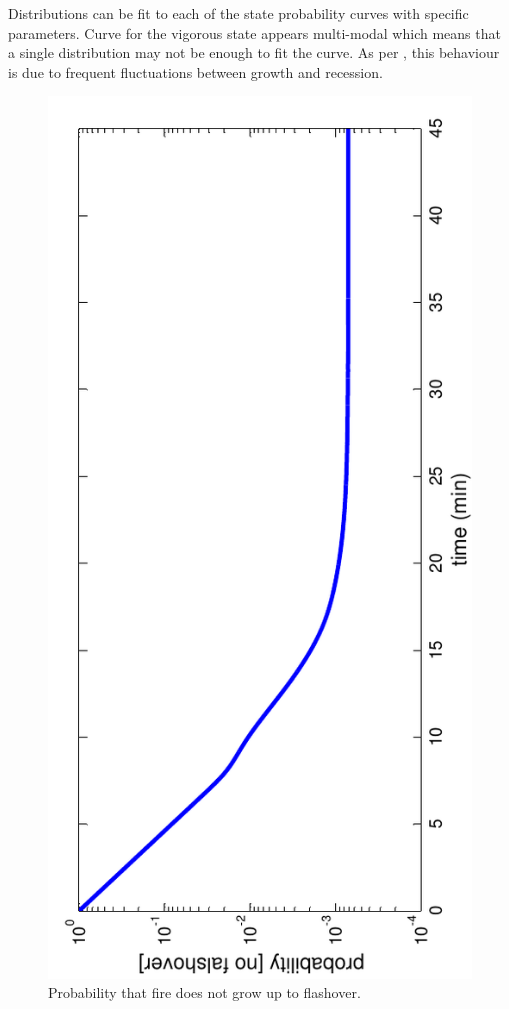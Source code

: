\documentclass[12pt]{asme2ej}
\begin{document}
Distributions can be fit to each of the state probability curves with specific parameters. Curve for the vigorous state appears multi-modal which means that a single distribution may not be enough to fit the curve. As per \cite{Berlin1985}, this behaviour is due to frequent fluctuations between growth and recession. 


\begin{figure}[h!] \centering
  \includegraphics[scale=0.8, angle=-90]{NoFlashover}
  \caption{Probability that fire does not grow up to flashover.\label{fig:NoFlashover}} 
\end{figure}
\end{document}
